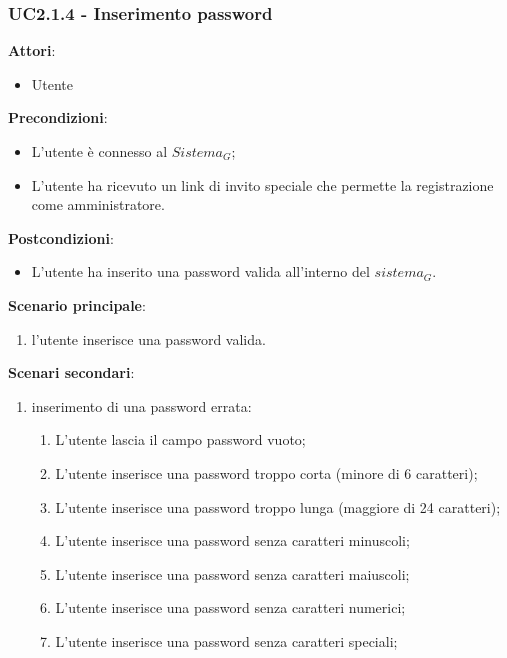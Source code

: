 \subsubsection{UC2.1.4 - Inserimento password}\label{usecase:2_1_4}
\textbf{Attori}:
\begin{itemize}
    \item Utente
\end{itemize}
\textbf{Precondizioni}:
\begin{itemize}
    \item L'utente è connesso al $\textit{Sistema}_G$;
    \item L'utente ha ricevuto un link di invito speciale che permette la registrazione come amministratore.
\end{itemize}
\textbf{Postcondizioni}:
\begin{itemize}
    \item L'utente ha inserito una password valida all'interno del $\textit{sistema}_G$.
\end{itemize}
\textbf{Scenario principale}:
\begin{enumerate}
    \item l'utente inserisce una password valida.
\end{enumerate}
\textbf{Scenari secondari}:

\begin{enumerate}
    \item inserimento di una password errata:
    \begin{enumerate}
            \item L'utente lascia il campo password vuoto;
            \item L'utente inserisce una password troppo corta (minore di 6 caratteri);
            \item L'utente inserisce una password troppo lunga (maggiore di 24 caratteri);
            \item L'utente inserisce una password senza caratteri minuscoli;
            \item L'utente inserisce una password senza caratteri maiuscoli;
            \item L'utente inserisce una password senza caratteri numerici;
            \item L'utente inserisce una password senza caratteri speciali;
        \end{enumerate} 
\end{enumerate}